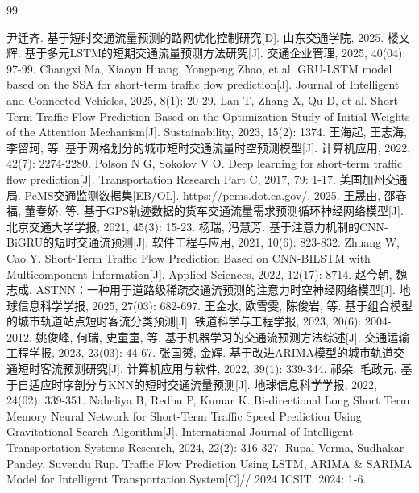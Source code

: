 \documentclass[12pt,a4paper,oneside]{ctexbook}
\begin{document}
	\begin{thebibliography}{99}
		
		 尹迁齐. 基于短时交通流量预测的路网优化控制研究[D]. 山东交通学院, 2025.
		 楼文辉. 基于多元LSTM的短期交通流量预测方法研究[J]. 交通企业管理, 2025, 40(04): 97-99.
		 Changxi Ma, Xiaoyu Huang, Yongpeng Zhao, et al. GRU-LSTM model based on the SSA for short-term traffic flow prediction[J]. Journal of Intelligent and Connected Vehicles, 2025, 8(1): 20-29.
		 Lan T, Zhang X, Qu D, et al. Short-Term Traffic Flow Prediction Based on the Optimization Study of Initial Weights of the Attention Mechanism[J]. Sustainability, 2023, 15(2): 1374.
		 王海起, 王志海, 李留珂, 等. 基于网格划分的城市短时交通流量时空预测模型[J]. 计算机应用, 2022, 42(7): 2274-2280.
		 Polson N G, Sokolov V O. Deep learning for short-term traffic flow prediction[J]. Transportation Research Part C, 2017, 79: 1-17.
		 美国加州交通局. PeMS交通监测数据集[EB/OL]. https://pems.dot.ca.gov/, 2025.
		 王晟由, 邵春福, 董春娇, 等. 基于GPS轨迹数据的货车交通流量需求预测循环神经网络模型[J]. 北京交通大学学报, 2021, 45(3): 15-23.
		 杨瑞, 冯慧芳. 基于注意力机制的CNN-BiGRU的短时交通流预测[J]. 软件工程与应用, 2021, 10(6): 823-832.
		 Zhuang W, Cao Y. Short-Term Traffic Flow Prediction Based on CNN-BILSTM with Multicomponent Information[J]. Applied Sciences, 2022, 12(17): 8714.
		 赵今朝, 魏志成. ASTNN：一种用于道路级稀疏交通流预测的注意力时空神经网络模型[J]. 地球信息科学学报, 2025, 27(03): 682-697.
		 王金水, 欧雪雯, 陈俊岩, 等. 基于组合模型的城市轨道站点短时客流分类预测[J]. 铁道科学与工程学报, 2023, 20(6): 2004-2012.
		 姚俊峰, 何瑞, 史童童, 等. 基于机器学习的交通流预测方法综述[J]. 交通运输工程学报, 2023, 23(03): 44-67.
		 张国赟, 金辉. 基于改进ARIMA模型的城市轨道交通短时客流预测研究[J]. 计算机应用与软件, 2022, 39(1): 339-344.
		 祁朵, 毛政元. 基于自适应时序剖分与KNN的短时交通流量预测[J]. 地球信息科学学报, 2022, 24(02): 339-351.
		 Naheliya B, Redhu P, Kumar K. Bi-directional Long Short Term Memory Neural Network for Short-Term Traffic Speed Prediction Using Gravitational Search Algorithm[J]. International Journal of Intelligent Transportation Systems Research, 2024, 22(2): 316-327.
		 Rupal Verma, Sudhakar Pandey, Suvendu Rup. Traffic Flow Prediction Using LSTM, ARIMA \& SARIMA Model for Intelligent Transportation System[C]// 2024 ICSIT. 2024: 1-6.

\end{thebibliography}
\end{document}
